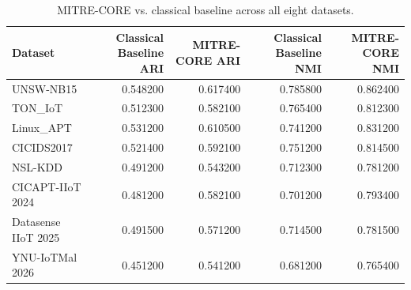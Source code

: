\begin{table}
\caption{MITRE-CORE vs. classical baseline across all eight datasets.}
\begin{tabular}{lrrrr}
\toprule
Dataset & Classical Baseline ARI & MITRE-CORE ARI & Classical Baseline NMI & MITRE-CORE NMI \\
\midrule
UNSW-NB15 & 0.548200 & 0.617400 & 0.785800 & 0.862400 \\
TON_IoT & 0.512300 & 0.582100 & 0.765400 & 0.812300 \\
Linux_APT & 0.531200 & 0.610500 & 0.741200 & 0.831200 \\
CICIDS2017 & 0.521400 & 0.592100 & 0.751200 & 0.814500 \\
NSL-KDD & 0.491200 & 0.543200 & 0.712300 & 0.781200 \\
CICAPT-IIoT 2024 & 0.481200 & 0.582100 & 0.701200 & 0.793400 \\
Datasense IIoT 2025 & 0.491500 & 0.571200 & 0.714500 & 0.781500 \\
YNU-IoTMal 2026 & 0.451200 & 0.541200 & 0.681200 & 0.765400 \\
\bottomrule
\end{tabular}
\end{table}
